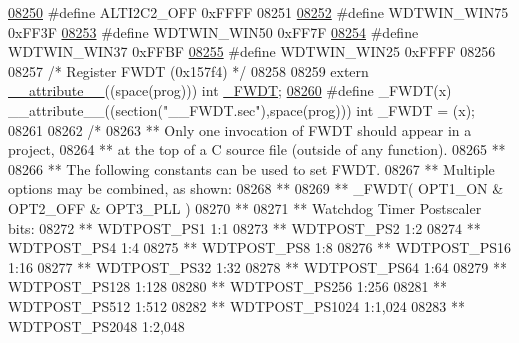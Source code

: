 \begin{DoxyCode}
{{{{\hypertarget{a00009_source_l08250}{}\hyperlink{a00009_a1fe2caf7e8cd77c1d19b700df4a5e724}{08250} \textcolor{preprocessor}{#define ALTI2C2\_OFF          0xFFFF}
08251 
\hypertarget{a00009_source_l08252}{}\hyperlink{a00009_a4b276e454c507f1ded7aba45063533ea}{08252} \textcolor{preprocessor}{#define WDTWIN\_WIN75         0xFF3F}
\hypertarget{a00009_source_l08253}{}\hyperlink{a00009_ab58c947ebb61320f04a8f3546b653c91}{08253} \textcolor{preprocessor}{#define WDTWIN\_WIN50         0xFF7F}
\hypertarget{a00009_source_l08254}{}\hyperlink{a00009_a23457be4f3434583f273e6c1e8dce8f1}{08254} \textcolor{preprocessor}{#define WDTWIN\_WIN37         0xFFBF}
\hypertarget{a00009_source_l08255}{}\hyperlink{a00009_a5dfbcf59299b0e595eed8212caf8159c}{08255} \textcolor{preprocessor}{#define WDTWIN\_WIN25         0xFFFF}
08256 
08257 \textcolor{comment}{/* Register FWDT (0x157f4)                               */}
08258 
08259 \textcolor{keyword}{extern} \hyperlink{a00009_a493c46f03454991ccc5aa7a6e1dfb2a7}{\_\_attribute\_\_}((space(prog))) int \hyperlink{a00009_af24dea78c3111674d8bd9d621f1023ad}{\_FWDT};
\hypertarget{a00009_source_l08260}{}\hyperlink{a00009_af24dea78c3111674d8bd9d621f1023ad}{08260} \textcolor{preprocessor}{#define \_FWDT(x) \_\_attribute\_\_((section("\_\_FWDT.sec"),space(prog))) int \_FWDT = (x);}
08261 
08262 \textcolor{comment}{/*}
08263 \textcolor{comment}{** Only one invocation of FWDT should appear in a project,}
08264 \textcolor{comment}{** at the top of a C source file (outside of any function).}
08265 \textcolor{comment}{**}
08266 \textcolor{comment}{** The following constants can be used to set FWDT.}
08267 \textcolor{comment}{** Multiple options may be combined, as shown:}
08268 \textcolor{comment}{**}
08269 \textcolor{comment}{** \_FWDT( OPT1\_ON & OPT2\_OFF & OPT3\_PLL )}
08270 \textcolor{comment}{**}
08271 \textcolor{comment}{**   Watchdog Timer Postscaler bits:}
08272 \textcolor{comment}{**     WDTPOST\_PS1          1:1}
08273 \textcolor{comment}{**     WDTPOST\_PS2          1:2}
08274 \textcolor{comment}{**     WDTPOST\_PS4          1:4}
08275 \textcolor{comment}{**     WDTPOST\_PS8          1:8}
08276 \textcolor{comment}{**     WDTPOST\_PS16         1:16}
08277 \textcolor{comment}{**     WDTPOST\_PS32         1:32}
08278 \textcolor{comment}{**     WDTPOST\_PS64         1:64}
08279 \textcolor{comment}{**     WDTPOST\_PS128        1:128}
08280 \textcolor{comment}{**     WDTPOST\_PS256        1:256}
08281 \textcolor{comment}{**     WDTPOST\_PS512        1:512}
08282 \textcolor{comment}{**     WDTPOST\_PS1024       1:1,024}
08283 \textcolor{comment}{**     WDTPOST\_PS2048       1:2,048}
}}}}
\end{DoxyCode}
